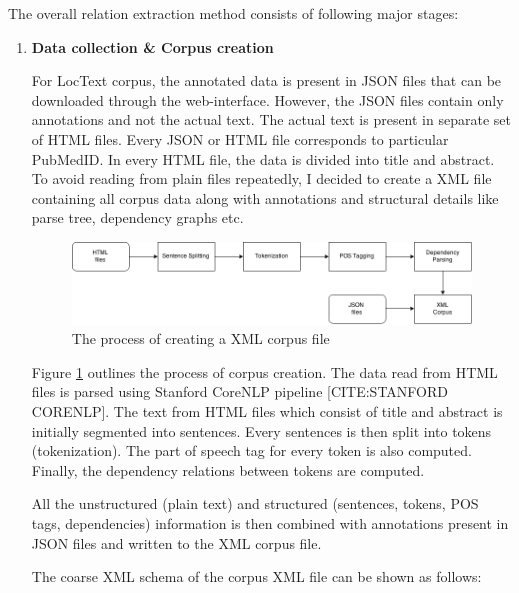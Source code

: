 The overall relation extraction method consists of following major stages:

\begin{enumerate}

\item \textbf{Data collection \& Corpus creation}

For LocText corpus, the annotated data is present in JSON files that can be downloaded through the web-interface. However, the JSON files contain only annotations and not the actual text. The actual text is present in separate set of HTML files. Every JSON or HTML file corresponds to particular PubMedID. In every HTML file, the data is divided into title and abstract. To avoid reading from plain files repeatedly, I decided to create a XML file containing all corpus data along with annotations and structural details like parse tree, dependency graphs etc.

\begin{figure}
\centering
\includegraphics[scale=0.4]{figures/Corpus_Creation.png}
\caption{The process of creating a XML corpus file}\label{fig:corpusCreation}
\end{figure}

Figure \ref{fig:corpusCreation} outlines the process  of corpus creation. The data read from HTML files is parsed using Stanford CoreNLP pipeline [CITE:STANFORD CORENLP]. The text from HTML files which consist of title and abstract is initially segmented into sentences. Every sentences is then split into tokens (tokenization). The part of speech tag for every token is also computed. Finally, the dependency relations between tokens are computed.

All the unstructured (plain text) and structured (sentences, tokens, POS tags, dependencies) information is then combined with annotations present in JSON files and written to the XML corpus file.

The coarse XML schema of the corpus XML file can be shown as follows:


\hspace{5 mm}

\hspace{10 mm}


\end{enumerate}

